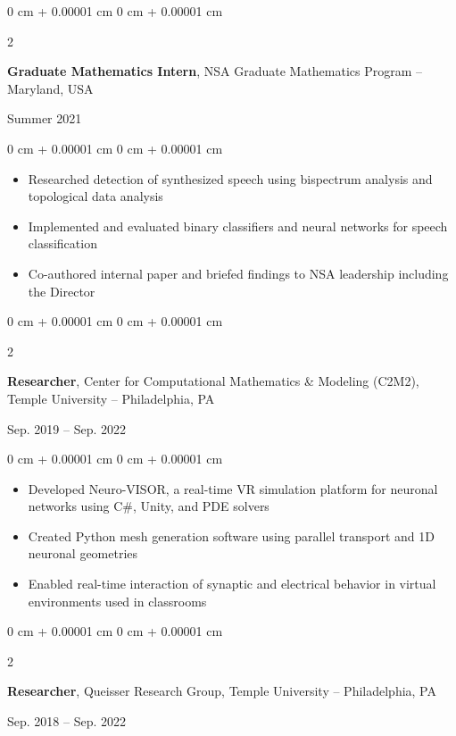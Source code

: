 \documentclass[10pt, letterpaper]{article}
\newenvironment{highlights}{
    \begin{itemize}[
        topsep=0.10 cm,
        parsep=0.10 cm,
        partopsep=0pt,
        itemsep=0pt,
        leftmargin=0 cm + 10pt
    ]
}{
    \end{itemize}
} %
\newenvironment{onecolentry}{
    \begin{adjustwidth}{
        0 cm + 0.00001 cm
    }{
        0 cm + 0.00001 cm
    }
}{
    \end{adjustwidth}
} %
\newenvironment{twocolentry}[2][]{
    \onecolentry
    \def\secondColumn{#2}
    \setcolumnwidth{\fill, 4.5 cm}
    \begin{paracol}{2}
}{
    \switchcolumn \raggedleft \secondColumn
    \end{paracol}
    \endonecolentry
} %
\begin{document}
\vspace{0.2 cm}

\begin{twocolentry}{
    Summer 2021
}
    \textbf{Graduate Mathematics Intern}, NSA Graduate Mathematics Program -- Maryland, USA
\end{twocolentry}

\vspace{0.10 cm}
\begin{onecolentry}
    \begin{highlights}
        \item Researched detection of synthesized speech using bispectrum analysis and topological data analysis
        \item Implemented and evaluated binary classifiers and neural networks for speech classification
        \item Co-authored internal paper and briefed findings to NSA leadership including the Director
    \end{highlights}
\end{onecolentry}

\vspace{0.2 cm}

\begin{twocolentry}{
    Sep. 2019 – Sep. 2022
}
    \textbf{Researcher}, Center for Computational Mathematics \& Modeling (C2M2), Temple University -- Philadelphia, PA
\end{twocolentry}

\vspace{0.10 cm}
\begin{onecolentry}
    \begin{highlights}
        \item Developed Neuro-VISOR, a real-time VR simulation platform for neuronal networks using C\#, Unity, and PDE solvers
        \item Created Python mesh generation software using parallel transport and 1D neuronal geometries
        \item Enabled real-time interaction of synaptic and electrical behavior in virtual environments used in classrooms
    \end{highlights}
\end{onecolentry}

\vspace{0.2 cm}

\begin{twocolentry}{
    Sep. 2018 – Sep. 2022
}
    \textbf{Researcher}, Queisser Research Group, Temple University -- Philadelphia, PA
\end{twocolentry}
\end{document}
